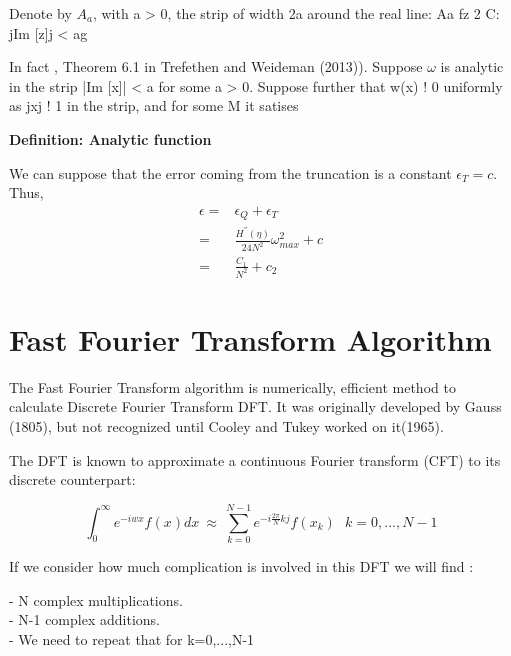 \documentclass[12pt]{report}
\begin{document}
Denote by $A_a$, with a > 0, the strip of width 2a around the real line:
Aa  fz 2 C: jIm [z]j < ag

In fact , 
Theorem 6.1 in Trefethen and Weideman (2013)). Suppose $\omega$ is analytic in the strip |Im [x]| < a for some a > 0. Suppose further that w(x) ! 0 uniformly as
jxj ! 1 in the strip, and for some M it satises

\textbf{Definition: Analytic function} 






 We can suppose that the error coming from the truncation is a constant $\epsilon_T=c$. 
Thus, 
\begin{align}
\epsilon=&\epsilon_Q+\epsilon_T \nonumber \\
=&\frac{H^{''}(\eta)}{24N^2} \omega_{max}^2+c \nonumber \\
=&\frac{C_1}{N^2}+c_2
\end{align}

\section{Fast Fourier Transform Algorithm}
The Fast Fourier Transform algorithm is numerically, efficient method to calculate Discrete Fourier Transform DFT. It was originally developed by Gauss (1805), but not recognized until Cooley and Tukey worked on it(1965).

The DFT is known to approximate a continuous Fourier transform (CFT) to its discrete counterpart:

\begin{equation}
\int_{0}^{\infty} e^{-iwx}f(x) dx ~\approx ~ \sum \limits_{k=0}^{N-1} e^{-i \frac{2\pi}{N}kj} f(x_k)~~~ k=0,...,N-1
\label{FFT}
\end{equation}


If we consider how much complication is involved in this DFT we will find :

- N complex multiplications.\\
- N-1 complex additions. \\
- We need to repeat that for k=0,...,N-1\\
\end{document}
